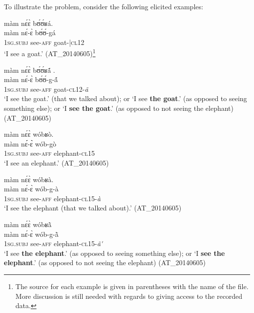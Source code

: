 \documentclass[output=paper]{langsci/langscibook}
\begin{document}
To illustrate the problem, consider the following elicited examples:

\ea\label{ex:teo:1}
\glll màm n\'ɛ\`ɛ b\'ʊ\'ʊʁá.{\rmfnm}\\
màm n\'ɛ-\`ɛ b\'ʊ\'ʊ-gá\\
1\textsc{sg.subj} see-\textsc{aff} goat-|\textsc{cl}12  \\
\glt ‘I see a goat.’ (AT\_20140605)\footnote{The source for each example is given in parentheses with the name of the file. More discussion is still needed with regards to giving access to the recorded data.}

\z
{} 

\ea\label{ex:teo:2}
\glll màm n\'ɛ\`ɛ b\'ʊ\'ʊʁ\'{ã} .\\
màm n\'ɛ-\`ɛ b\'ʊ\'ʊ-g-\'{ã}\\
\textsc{1sg}.\textsc{subj} see-\textsc{aff} goat-\textsc{cl12}-\textit{ã}\\
\glt ‘I see the goat.’ (that we talked about); or ‘I see \textbf{the goat}.’ (as opposed to seeing something else); or ‘I \textbf{see the goat}.’ (as opposed to not seeing the elephant) (AT\_20140605)
\z

\ea\label{ex:teo:3} 
\glll màm n\'ɛ\`ɛ wóbʁò.\\
màm n\'{\'ɛ}-\`{\`ɛ} wób-gò\\
\textsc{1sg.subj} see-\textsc{aff} elephant-\textsc{cl15}\\
\glt  ‘I see an elephant.’ (AT\_20140605)
\z

\ea\label{ex:teo:4}
\glll  màm n\'ɛ\`ɛ wóbʁà.\\
màm n\'ɛ-\`ɛ wób-g-à\\
\textsc{1sg.subj} see-\textsc{aff} elephant-\textsc{cl15-}\textit{à} \\
\glt ‘I see the elephant (that we talked about).’ (AT\_20140605)
\z

\ea\label{ex:teo:5}
\glll  màm n\'ɛ\`ɛ wóbʁ\`{ã} \\
màm n\'ɛ-\`ɛ wób-g-\`{ã} \\
\textsc{1sg.subj} see-\textsc{aff} elephant-\textsc{cl15-}\textit{ã\'{}} \\
\glt ‘I see \textbf{the elephant}.’ (as opposed to seeing something else); or ‘I \textbf{see the elephant}.’ (as opposed to not seeing the elephant) (AT\_20140605)
\z
\end{document}
